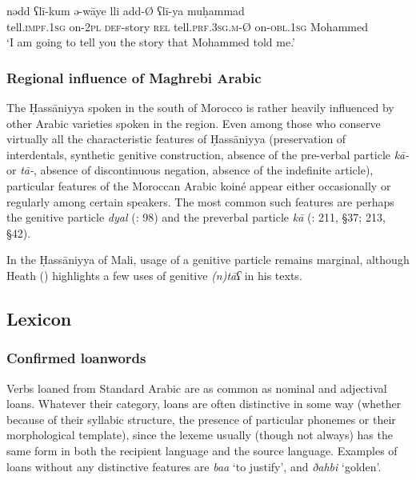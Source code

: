 \documentclass[output=paper]{langsci/langscibook}
\begin{document}
\ea
\gll n{\R}ədd ʕlī-kum ə{\R}-{\R}wāye lli {\R}add-Ø ʕlī-ya muḥammad\\
 tell.\textsc{impf.}1\textsc{sg} on-2\textsc{pl} \textsc{def-}story \textsc{rel} tell.\textsc{prf.3sg.m-}Ø on-\textsc{obl.1sg} Mohammed\\
\glt ‘I am going to tell you the story that Mohammed told me.’ 
\z

\subsubsection{ Regional influence of Maghrebi Arabic} %

The Ḥassāniyya spoken in the south of Morocco is rather heavily influenced by other Arabic varieties spoken in the region. Even among those who conserve virtually all the characteristic features of Ḥassāniyya (preservation of interdentals, synthetic genitive construction, absence of the pre-verbal particle \textit{kā-} or \textit{tā-}, absence of discontinuous negation, absence of the indefinite article), particular features of the Moroccan Arabic koiné appear either occasionally or regularly among certain speakers. The most common such features are perhaps the genitive particle \textit{dyal} (\citealt{Taine-Cheikh1997socio}: 98) and the preverbal particle \textit{kā} (\citealt{Aguadé1998}: 211, §37; 213, §42).

In the Ḥassāniyya of Mali, usage of a genitive particle remains marginal, although Heath (\citeyear[162]{Heath2004}) highlights a few uses of genitive \textit{(n)tāʕ} in his texts.

\subsection{ Lexicon} %

\subsubsection{ Confirmed loanwords} %


Verbs loaned from Standard Arabic are as common as nominal and adjectival loans. Whatever their category, loans are often distinctive in some way (whether because of their syllabic structure, the presence of particular phonemes or their morphological template), since the lexeme usually (though not always) has the same form in both the recipient language and the source language. Examples of loans without any distinctive features are \textit{ba{\R}{\R}a{\R}} ‘to justify’, and \textit{ðahbi} ‘golden’. 
\end{document}
